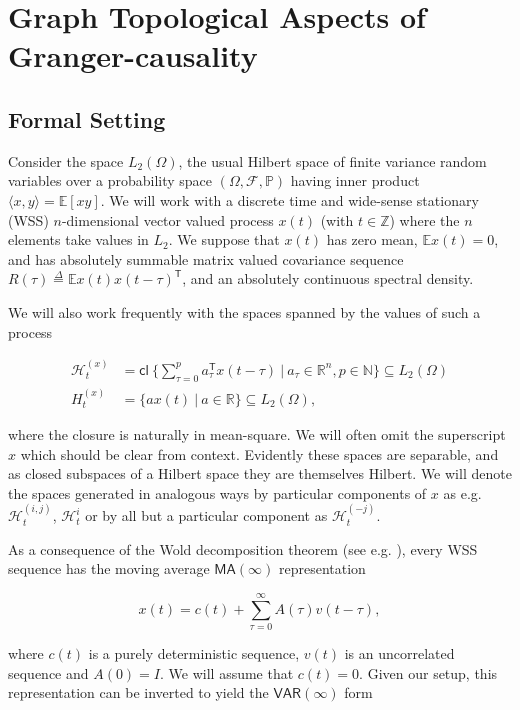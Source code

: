 \documentclass{statsoc}
\def\VAR{\mathsf{VAR}}  %
\def\MA{\mathsf{MA}}  %
\def\H{\mathcal{H}}  %
\def\cl{\mathsf{cl\ }}  %
\def\H{\mathcal{H}}  %
\def\E{\mathbb{E}}  %
\def\Z{\mathbb{Z}}  %
\def\R{\mathbb{R}}  %
\def\N{\mathbb{N}}  %
\def\T{\mathsf{T}}  %
\newcommand{\inner}[2]{\langle #1, #2 \rangle}  %
\begin{document}
\section{Graph Topological Aspects of Granger-causality}
\label{sec:theory}
\subsection{Formal Setting}
Consider the space $L_2(\Omega)$, the usual Hilbert space of finite
variance random variables over a probability space
$(\Omega, \mathcal{F}, \mathbb{P})$ having inner product
$\inner{x}{y} = \E[xy]$.  We will work with a discrete time and
wide-sense stationary (WSS) $n$-dimensional vector valued process
$x(t)$ (with $t \in \Z$) where the $n$ elements take values in $L_2$.
We suppose that $x(t)$ has zero mean, $\E x(t) = 0$, and has
absolutely summable matrix valued covariance sequence
$R(\tau) \overset{\Delta}{=} \E x(t)x(t - \tau)^\T$, and an absolutely continuous
spectral density.

We will also work frequently with the spaces spanned by the values of
such a process

\begin{equation}
  \label{eq:hilbert_space_defn}
  \begin{aligned}
    \H_t^{(x)} &= \cl \{\sum_{\tau = 0}^p a_\tau^\T x(t - \tau)\ |\ a_\tau \in \R^n, p \in \N\} \subseteq L_2(\Omega)\\
    H_t^{(x)} &= \{a x(t)\ |\ a \in \R\} \subseteq L_2(\Omega),
  \end{aligned}
\end{equation}

where the closure is naturally in mean-square.  We will often omit the
superscript $x$ which should be clear from context.  Evidently these
spaces are separable, and as closed subspaces of a Hilbert space they
are themselves Hilbert.  We will denote the spaces generated in
analogous ways by particular components of $x$ as e.g.
$\H_t^{(i, j)}$, $\H_t^{i}$ or by all but a particular component as
$\H_t^{(-j)}$.

As a consequence of the Wold decomposition theorem (see
e.g. \cite{lindquist}), every WSS sequence has the moving average
$\MA(\infty)$ representation

\begin{equation}
  \label{eqn:wold}
  x(t) = c(t) + \sum_{\tau = 0}^\infty A(\tau) v(t - \tau),
\end{equation}

where $c(t)$ is a purely deterministic sequence, $v(t)$ is an
uncorrelated sequence and $A(0) = I$.  We will assume that $c(t) = 0$.
Given our setup, this representation can be inverted to yield the
$\VAR(\infty)$ form
\end{document}
